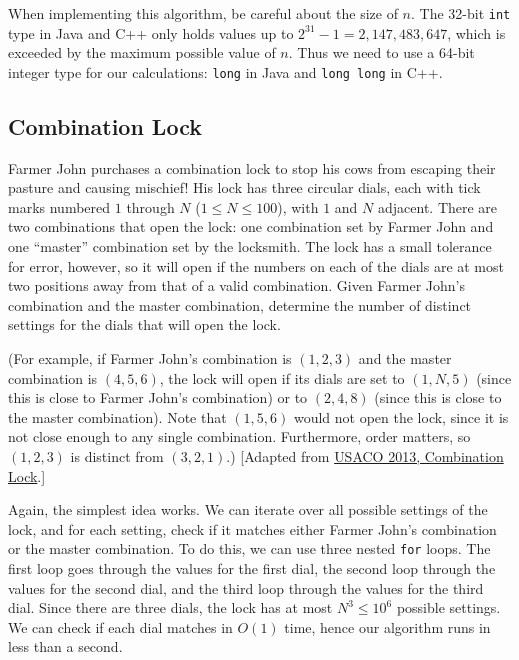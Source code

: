 When implementing this algorithm, be careful about the size of $n$. The 32-bit \texttt{int} type in Java and C++ only holds values up to $2^{31} - 1 = 2,147,483,647$, which is exceeded by the maximum possible value of $n$. Thus we need to use a 64-bit integer type for our calculations: \texttt{long} in Java and \texttt{long long} in C++.

\subsection{Combination Lock}

\begin{typewriter}
  Farmer John purchases a combination lock to stop his cows from escaping their pasture and causing mischief! His lock has three circular dials, each with tick marks numbered $1$ through $N$ ($1\le N\le 100$), with $1$ and $N$ adjacent. There are two combinations that open the lock: one combination set by Farmer John and one ``master'' combination set by the locksmith. The lock has a small tolerance for error, however, so it will open if the numbers on each of the dials are at most two positions away from that of a valid combination. Given Farmer John's combination and the master combination, determine the number of distinct settings for the dials that will open the lock. 

  (For example, if Farmer John's combination is $(1,2,3)$ and the master combination is $(4,5,6)$, the lock will open if its dials are set to $(1,N,5)$ (since this is close to Farmer John's combination) or to $(2,4,8)$ (since this is close to the master combination). Note that $(1,5,6)$ would not open the lock, since it is not close enough to any single combination. Furthermore, order matters, so $(1,2,3)$ is distinct from $(3,2,1)$.) [Adapted from \href{http://usaco.org/index.php?page=viewproblem2&cpid=340}{USACO 2013, Combination Lock}.]
\end{typewriter}

Again, the simplest idea works. We can iterate over all possible settings of the lock, and for each setting, check if it matches either Farmer John's combination or the master combination. To do this, we can use three nested \texttt{for} loops. The first loop goes through the values for the first dial, the second loop through the values for the second dial, and the third loop through the values for the third dial. Since there are three dials, the lock has at most $N^3 \le 10^6$ possible settings. We can check if each dial matches in $O(1)$ time, hence our algorithm runs in less than a second.

